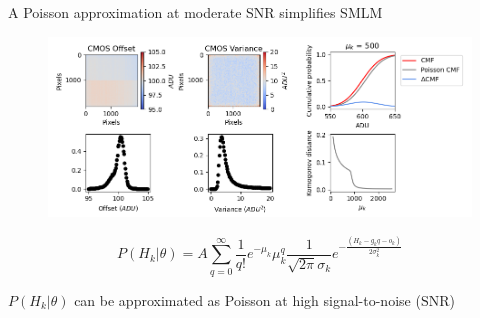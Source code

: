 \documentclass{beamer}					%
\begin{document}
\begin{frame}{A Poisson approximation at moderate SNR simplifies SMLM}

\begin{figure}
\includegraphics[width=13cm]{Noise.png}
\end{figure}

\begin{equation*}
P(H_{k}|\theta) = A\sum_{q=0}^{\infty} \frac{1}{q!}e^{-\mu_{k}}\mu_{k}^{q}\frac{1}{\sqrt{2\pi}\sigma_{k}}e^{-\frac{(H_{k}-g_{k}q-o_{k})}{2\sigma_{k}^{2}}}
\end{equation*}

$P(H_{k}|\theta)$ can be approximated as Poisson at high signal-to-noise ($\mathrm{SNR}$)
 
\end{frame}
\end{document}
